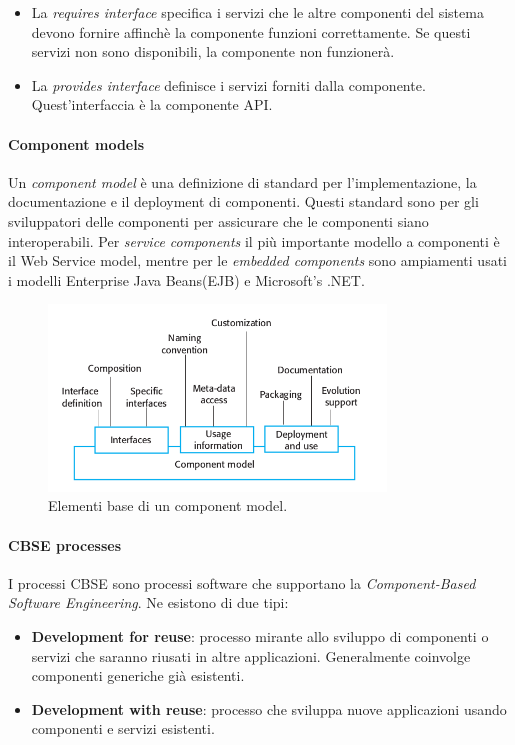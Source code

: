  			\begin{itemize}
 			 	\item La \textit{requires interface} specifica i servizi che le altre componenti del sistema devono fornire affinchè la componente funzioni correttamente. Se questi servizi non sono disponibili, la componente non funzionerà.
 			 	\item La \textit{provides interface} definisce i servizi forniti dalla componente. Quest'interfaccia è la componente API.
 			\end{itemize}

 			\paragraph{Component models}
 			Un \textit{component model} è una definizione di standard per l'implementazione, la documentazione e il deployment di componenti. Questi standard sono per gli sviluppatori delle componenti per assicurare che le componenti siano interoperabili. Per \textit{service components} il più importante modello a componenti è il Web Service model, mentre per le \textit{embedded components} sono ampiamenti usati i modelli Enterprise Java Beans(EJB) e Microsoft's .NET.

 			\begin{figure}[H]
 				\centering
 				\includegraphics[width=0.8\textwidth]{img/componentmodel}
 				\caption{Elementi base di un component model.}
 			\end{figure}

 			\paragraph{CBSE processes}
 			I processi CBSE sono processi software che supportano la \textit{Component-Based Software Engineering}. Ne esistono di due tipi:
 			\begin{itemize}
 				\item \textbf{Development for reuse}: processo mirante allo sviluppo di componenti o servizi che saranno riusati in altre applicazioni. Generalmente coinvolge componenti generiche già esistenti.
 				\item \textbf{Development with reuse}: processo che sviluppa nuove applicazioni usando componenti e servizi esistenti.
 			\end{itemize}



